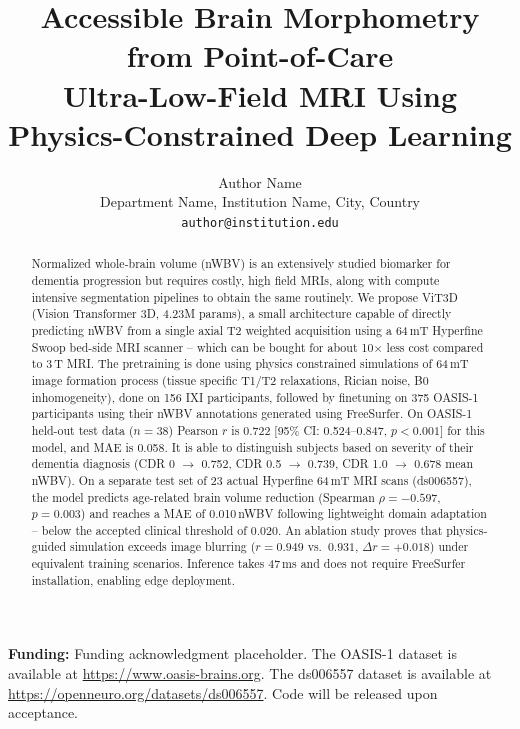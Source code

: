 \documentclass[12pt,a4paper]{article}
\begin{document}
\title{\textbf{Accessible Brain Morphometry from Point-of-Care\\
Ultra-Low-Field MRI Using Physics-Constrained Deep Learning}}

\author{Author Name\\
\small Department Name, Institution Name, City, Country\\
\small \texttt{author@institution.edu}}

\date{}
\maketitle

\noindent\textbf{Funding:} Funding acknowledgment placeholder.
The OASIS-1 dataset is available at \url{https://www.oasis-brains.org}.
The ds006557 dataset is available at \url{https://openneuro.org/datasets/ds006557}.
Code will be released upon acceptance.

\bigskip

\begin{abstract}
Normalized whole-brain volume (nWBV) is an extensively studied biomarker for
dementia progression but requires costly, high field MRIs, along with compute
intensive segmentation pipelines to obtain the same routinely. We propose
ViT3D (Vision Transformer 3D, 4.23M params), a small architecture capable of
directly predicting nWBV from a single axial T2 weighted acquisition using a
64\,mT Hyperfine Swoop bed-side MRI scanner -- which can be bought for about
10$\times$ less cost compared to 3\,T MRI. The pretraining is done using
physics constrained simulations of 64\,mT image formation process (tissue
specific T1/T2 relaxations, Rician noise, B0 inhomogeneity), done on 156 IXI
participants, followed by finetuning on 375 OASIS-1 participants using their
nWBV annotations generated using FreeSurfer. On OASIS-1 held-out test data
($n = 38$) Pearson $r$ is 0.722 [95\% CI: 0.524--0.847, $p < 0.001$] for
this model, and MAE is 0.058. It is able to distinguish subjects based on
severity of their dementia diagnosis (CDR 0 $\to$ 0.752, CDR 0.5 $\to$
0.739, CDR 1.0 $\to$ 0.678 mean nWBV). On a separate test set of 23 actual
Hyperfine 64\,mT MRI scans (ds006557), the model predicts age-related brain
volume reduction (Spearman $\rho = -0.597$, $p = 0.003$) and reaches a MAE
of 0.010\,nWBV following lightweight domain adaptation -- below the accepted
clinical threshold of 0.020. An ablation study proves that physics-guided
simulation exceeds image blurring ($r = 0.949$ vs.\ $0.931$, $\Delta r =
+0.018$) under equivalent training scenarios. Inference takes 47\,ms and
does not require FreeSurfer installation, enabling edge deployment.
\end{abstract}
\end{document}
